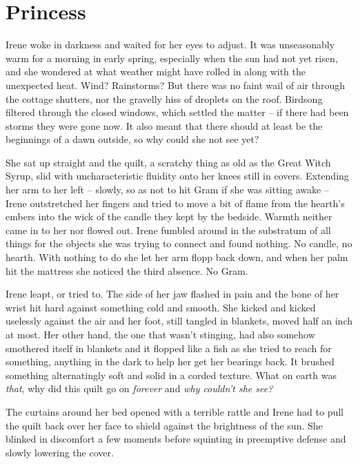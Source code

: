 \documentclass[../FGP.tex]{subfiles}
\begin{document}
\setmarginpargeometry
\section{Princess}
\begin{fragment}
Irene woke in darkness and waited for her eyes to adjust. It was unseasonably warm for a morning in early spring, especially when the sun had not yet risen, and she wondered at what weather might have rolled in along with the unexpected heat. Wind? Rainstorms? But there was no faint wail of air through the cottage shutters, nor the gravelly hiss of droplets on the roof. Birdsong filtered through the closed windows, which settled the matter -- if there had been storms they were gone now. It also meant that there should at least be the beginnings of a dawn outside, so why could she not see yet?

She sat up straight and the quilt, a scratchy thing as old as the Great Witch Syrup, slid with uncharacteristic fluidity onto her knees still in covers. Extending her arm to her left -- slowly, so as not to hit Gram if she was sitting awake -- Irene outstretched her fingers and tried to move a bit of flame from the hearth's embers into the wick of the candle they kept by the bedside. Warmth neither came in to her nor flowed out. Irene fumbled around in the substratum of all things for the objects she was trying to connect and found nothing. No candle, no hearth. With nothing to do she let her arm flopp back down, and when her palm hit the mattress she noticed the third absence. No Gram.

Irene leapt, or tried to. The side of her jaw flashed in pain and the bone of her wrist hit hard against something cold and smooth. She kicked and kicked uselessly against the air and her foot, still tangled in blankets, moved half an inch at most. Her other hand, the one that wasn't stinging, had also somehow smothered itself in blankets and it flopped like a fish as she tried to reach for something, anything in the dark to help her get her bearings back. It brushed something alternatingly soft and solid in a corded texture. What on earth was \emph{that}, why did this quilt go on \emph{forever} and \emph{why couldn't she see?} 

The curtains around her bed opened with a terrible rattle and Irene had to pull the quilt back over her face to shield against the brightness of the sun. She blinked in discomfort a few moments before squinting in preemptive defense and slowly lowering the cover.


\end{fragment}
\end{document}
